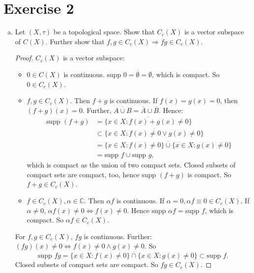 \documentclass[10pt]{article}\usepackage[]{graphicx}\usepackage[]{color}
\newcommand{\C}{\mathbb{C}}
\begin{document}
\section*{Exercise 2}
\begin{enumerate}[(a)]
  \item Let $(X, \tau)$ be a topological space.
  Show that $C_c(X)$ is a vector subspace
  of $C(X)$. Further show that $f, g \in C_c(X) \Rightarrow fg \in C_c(X)$.
  \begin{proof}
  $C_c(X)$ is a vector subspace:
  \begin{itemize}
    \item $0 \in C(X)$ is continuous. $\textrm{supp~} 0 = \overline{\emptyset} = \emptyset$, which is compact.
    So $0 \in C_c(X)$.

    \item $f, g \in C_c(X)$. Then $f + g$ is continuous.
    If $f(x) = g(x) = 0$, then $(f+g)(x) = 0$.
    Further, $\overline{A \cup B} = \overline{A} \cup \overline{B}$.
    Hence:
    \begin{align*}
      \textrm{supp~} (f+g)
      &= \overline{\{x \in X : f(x) + g(x) \neq 0\}} \\
      &\subset \overline{\{x \in X : f(x) \neq 0 \lor g(x) \neq 0\}} \\
      &= \overline{\{x \in X : f(x) \neq 0\} \cup \{x \in X :g(x) \neq 0\}} \\
      &= \textrm{supp~} f \cup \textrm{supp~} g,
    \end{align*}
    which is compact as the union of two compact sets. Closed subsets of 
    compact sets are compact, too, hence $ \textrm{supp~} (f+g)$ is compact.
    So $f+g \in C_c(X)$.

    \item $f \in C_c(X), \alpha \in \C$. Then $\alpha f$ is continuous.
    If $\alpha = 0, \alpha f \equiv 0 \in C_c(X)$.
    If $\alpha \neq 0$, $\alpha f(x) \neq 0 \Leftrightarrow f(x) \neq 0$. Hence
    $\textrm{supp~} \alpha f = \textrm{supp~} f$, which is compact. So $\alpha f \in C_c(X)$.
  \end{itemize}

  For $f,g \in C_c(X)$, $fg$ is continuous.
  Further: $(fg)(x) \neq 0 \Leftrightarrow f(x) \neq 0 \land g(x) \neq 0$.
  So
  \[
    \textrm{supp~} fg  = \overline{\{x \in X: f(x) \neq 0\} \cap \{x \in X : g(x) \neq 0\}} \subset \textrm{supp~} f.
  \]
  Closed subsets of compact sets are compact. So $fg \in C_c(X)$.
  \end{proof}


\end{enumerate}
\end{document}

